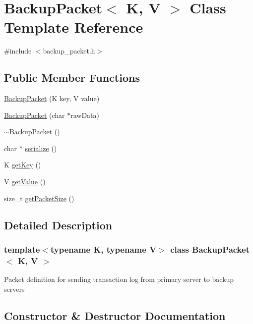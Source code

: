 \hypertarget{classBackupPacket}{}\section{Backup\+Packet$<$ K, V $>$ Class Template Reference}
\label{classBackupPacket}


{\ttfamily \#include $<$backup\+\_\+packet.\+h$>$}

\subsection*{Public Member Functions}
\begin{DoxyCompactItemize}
\item 
\mbox{\hyperlink{classBackupPacket_a26f60ca0db42e0bc9e7c0aa3df6e561f}{Backup\+Packet}} (K key, V value)
\item 
\mbox{\hyperlink{classBackupPacket_a09ccdce78d18e44e22dc3371035bed20}{Backup\+Packet}} (char $\ast$raw\+Data)
\item 
\mbox{\hyperlink{classBackupPacket_a81158ba89a90d03efb57d7d62f203beb}{$\sim$\+Backup\+Packet}} ()
\item 
char $\ast$ \mbox{\hyperlink{classBackupPacket_a626af7de776bd98ea1a322a4e9fd87bd}{serialize}} ()
\item 
K \mbox{\hyperlink{classBackupPacket_a36d0369d548f537a12840627a9fabbfd}{get\+Key}} ()
\item 
V \mbox{\hyperlink{classBackupPacket_a35e76302bebf4a0e6c871426844553fc}{get\+Value}} ()
\item 
size\+\_\+t \mbox{\hyperlink{classBackupPacket_a3bdc1916566a9cffbdd26abe5c87bdad}{get\+Packet\+Size}} ()
\end{DoxyCompactItemize}


\subsection{Detailed Description}
\subsubsection*{template$<$typename K, typename V$>$\newline
class Backup\+Packet$<$ K, V $>$}

Packet definition for sending transaction log from primary server to backup servers 

\subsection{Constructor \& Destructor Documentation}
\mbox{\label{classBackupPacket_a26f60ca0db42e0bc9e7c0aa3df6e561f}} 
